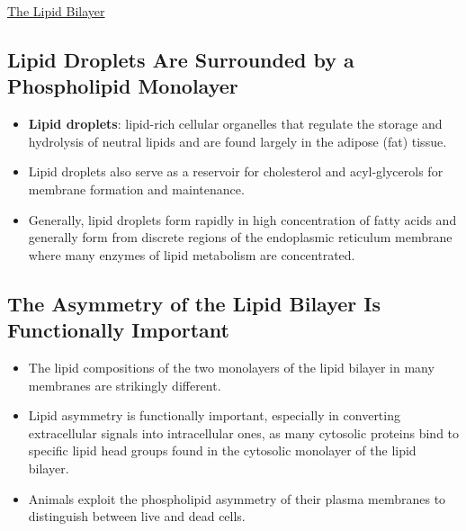 \documentclass[12pt,letterpaper]{article}
\begin{document}
\begin{secbox}{\hyperlink{10}{The Lipid Bilayer}}
{    \subsection*{Lipid Droplets Are Surrounded by a Phospholipid Monolayer}
    \begin{itemize}
        \item \textbf{Lipid droplets}: lipid-rich cellular organelles that regulate the storage and hydrolysis of neutral lipids and are found largely in the adipose (fat) tissue. 
        \item Lipid droplets also serve as a reservoir for cholesterol and acyl-glycerols for membrane formation and maintenance.
        \item Generally, lipid droplets form rapidly in high concentration of fatty acids and generally form from discrete regions of the endoplasmic reticulum membrane where many enzymes of lipid metabolism are concentrated.
    \end{itemize}

    \subsection*{The Asymmetry of the Lipid Bilayer Is Functionally Important}
    \begin{itemize}
        \item The lipid compositions of the two monolayers of the lipid bilayer in many membranes are strikingly different.
        \item Lipid asymmetry is functionally important, especially in converting extracellular signals into intracellular ones, as many cytosolic proteins bind to specific lipid head groups found in the cytosolic monolayer of the lipid bilayer. 
        \item Animals exploit the phospholipid asymmetry of their plasma membranes to
        distinguish between live and dead cells. 
    \end{itemize}
    
}
\end{secbox}
\end{document}
